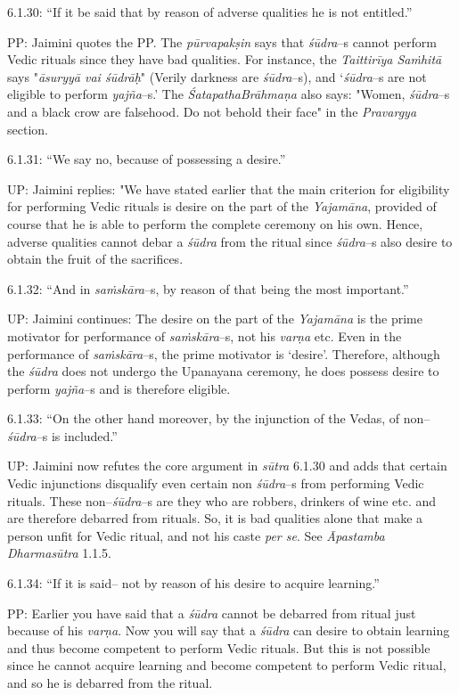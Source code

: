 6.1.30: “If it be said that by reason of adverse qualities he is not entitled.”

PP: Jaimini quotes the PP. The \textit{pūrvapakṣin} says that \textit{śūdra}–s cannot perform Vedic rituals since they have bad qualities. For instance, the \textit{Taittirīya Saṁhitā} says "\textit{āsuryyā vai śūdrāḥ}" (Verily darkness are \textit{śūdra}–s), and ‘\textit{śūdra}–s are not eligible to perform \textit{yajña}–s.’ The \textit{ŚatapathaBrāhmaṇa} also says: "Women, \textit{śūdra}–s and a black crow are falsehood. Do not behold their face" in the \textit{Pravargya} section.

6.1.31: “We say no, because of possessing a desire.”

UP: Jaimini replies: "We have stated earlier that the main criterion for eligibility for performing Vedic rituals is desire on the part of the \textit{Yajamāna}, provided of course that he is able to perform the complete ceremony on his own. Hence, adverse qualities cannot debar a \textit{śūdra} from the ritual since \textit{śūdra}–s also desire to obtain the fruit of the sacrifices.

6.1.32: “And in \textit{saṁskāra}–s, by reason of that being the most important.”

UP: Jaimini continues: The desire on the part of the \textit{Yajamāna} is the prime motivator for performance of \textit{saṁskāra}–s, not his \textit{varṇa }etc. Even in the performance of \textit{saṁskāra}–s, the prime motivator is ‘desire’. Therefore, although the \textit{śūdra} does not undergo the Upanayana ceremony, he does possess desire to perform \textit{yajña}–s and is therefore eligible.

6.1.33: “On the other hand moreover, by the injunction of the Vedas, of non–\textit{śūdra}–s is included.”

UP: Jaimini now refutes the core argument in \textit{sūtra} 6.1.30 and adds that certain Vedic injunctions disqualify even certain non \textit{śūdra}–s from performing Vedic rituals. These non–\textit{śūdra}–s are they who are robbers, drinkers of wine etc. and are therefore debarred from rituals. So, it is bad qualities alone that make a person unfit for Vedic ritual, and not his caste \textit{per se}. See \textit{Āpastamba Dharmasūtra} 1.1.5.

6.1.34: “If it is said– not by reason of his desire to acquire learning.”

PP: Earlier you have said that a \textit{śūdra} cannot be debarred from ritual just because of his \textit{varṇa}. Now you will say that a \textit{śūdra} can desire to obtain learning and thus become competent to perform Vedic rituals. But this is not possible since he cannot acquire learning and become competent to perform Vedic ritual, and so he is debarred from the ritual.

